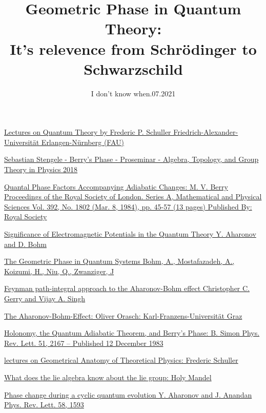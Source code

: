 \documentclass[8pt, a4paper]{article}
\title{\textbf{Geometric Phase in Quantum Theory: 
    \\ It's relevence from Schrödinger to Schwarzschild}}
\author{}
\date{I don't know when.07.2021}
\begin{document}
\begin{thebibliography}{}

 \href{https://mathswithphysics.blogspot.com/2016/07/frederic-schullers-lectures-on-quantum.html}{Lectures on Quantum Theory by Frederic P. Schuller Friedrich-Alexander-Universität Erlangen-Nürnberg (FAU)}
 
  \href{https://ethz.ch/content/dam/ethz/special-interest/phys/theoretical-physics/itp-dam/documents/gaberdiel/proseminar_fs2018/05_Stengele.pdf}{Sebastian Stengele - Berry's Phase - Proseminar - Algebra, Topology, and Group Theory in Physics 2018}
 
 \href{https://www.jstor.org/stable/2397741}{Quantal Phase Factors Accompanying Adiabatic Changes: 
M. V. Berry Proceedings of the Royal Society of London. Series A, Mathematical and Physical Sciences
Vol. 392, No. 1802 (Mar. 8, 1984), pp. 45-57 (13 pages)
Published By: Royal Society}

 \href{}{Significance of Electromagnetic Potentials in the Quantum Theory Y. Aharonov and D. Bohm}
 
 
 \href{}{The Geometric Phase in Quantum Systems  Bohm, A., Mostafazadeh, A., Koizumi, H., Niu, Q., Zwanziger, J}
  
  \href{}{Feynman path-integral approach to the Aharonov-Bohm effect
Christopher C. Gerry and Vijay A. Singh}

	 \href{https://physik.uni-graz.at/~uxh/diploma/orasch14.pdf}{The Aharonov-Bohm-Effect: Oliver Orasch: Karl-Franzens-Universität Graz}
	
	 \href{}{Holonomy, the Quantum Adiabatic Theorem, and Berry's Phase: B. Simon
Phys. Rev. Lett. 51, 2167 – Published 12 December 1983}

 \href{https://www.youtube.com/playlist?list=PLPH7f_7ZlzxTi6kS4vCmv4ZKm9u8g5yic}{lectures on Geometrical Anatomy of Theoretical Physics: Frederic Schuller }

 \href{https://math.uchicago.edu/~may/REU2016/REUPapers/Mandel.pdf}{What does the lie algebra know about the lie group: Holy Mandel}
  
  \href{}{Phase change during a cyclic quantum evolution
Y. Aharonov and J. Anandan
Phys. Rev. Lett. 58, 1593}
  
 
\end{thebibliography}
\end{document}
